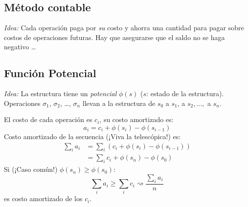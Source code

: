 \documentclass[english, spanish, fleqn, 10pt]{article}
\numberwithin{equation}{section}
\newcommand{\nparentesis}[1]{\left( #1 \right)}
\theoremstyle{definition}
\begin{document}
\subsection{Método contable}
\emph{Idea:} Cada operación paga por \emph{su} costo y ahorra una cantidad para pagar sobre costos de operaciones futuras. Hay que asegurarse que el saldo no se haga negativo \ldots
	
\subsection{Función Potencial}
\emph{Idea:} La estructura tiene un \emph{potencial} $\phi\nparentesis{s}$ ($s$: estado de la estructura). Operaciones $\sigma_1$, $\sigma_2$, \ldots, $\sigma_n$ llevan a la estructura de $s_0$ a $s_1$, a $s_2, \ldots,$ a $s_n$.

El costo de cada operación es $c_i$, su costo amortizado es:
\begin{equation*}
a_i = c_i + \phi\nparentesis{s_i} - \phi\nparentesis{s_{i-1}}
\end{equation*}	
Costo amortizado de la secuencia (¡Viva la telescópica!) es:
\begin{align*}
\sum_{i} a_i &= \sum_i \nparentesis{c_i + \phi \nparentesis{s_i} - \phi \nparentesis{s_{i-1}}}\\
&= \sum_i c_i + \phi \nparentesis{s_n} - \phi \nparentesis{s_0}
\end{align*}
Si (¡Caso común!) $\phi \nparentesis{s_n} \geq \phi \nparentesis{s_0}$:
\begin{equation*}
\sum_i a_i \geq \sum _i c_i \rightsquigarrow \dfrac{\sum_i a_i}{n}
\end{equation*}
es costo amortizado de los $c_i$.
\end{document}
